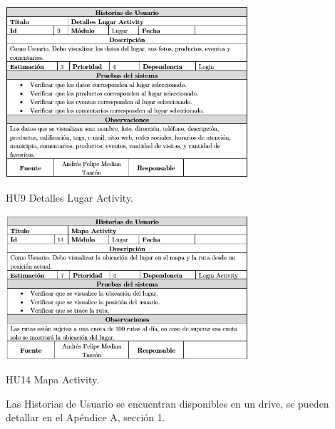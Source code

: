 \documentclass[12pt,letterpaper,openany]{book}
\begin{document}
\begin{table}[H]
\centering
\includegraphics[width=9cm]{./imagenes/HU/HU9}
\caption{HU9 Detalles Lugar Activity.}
\end{table}

\begin{table}[H]
\centering
\includegraphics[width=9cm]{./imagenes/HU/HU14}
\caption{HU14 Mapa Activity.}
\end{table}

Las Historias de Usuario se encuentran disponibles en un drive, se pueden detallar en el Apéndice A, sección 1.
\end{document}
